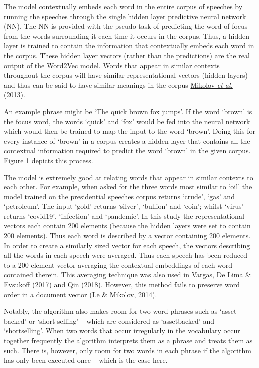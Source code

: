 \documentclass[11pt,preprint, authoryear]{elsarticle}
\numberwithin{equation}{section}
\numberwithin{figure}{section}
\numberwithin{table}{section}
\begin{document}
The model contextually embeds each word in the entire corpus of speeches
by running the speeches through the single hidden layer predictive
neural network (NN). The NN is provided with the pseudo-task of
predicting the word of focus from the words surrounding it each time it
occurs in the corpus. Thus, a hidden layer is trained to contain the
information that contextually embeds each word in the corpus. These
hidden layer vectors (rather than the predictions) are the real output
of the Word2Vec model. Words that appear in similar contexts throughout
the corpus will have similar representational vectors (hidden layers)
and thus can be said to have similar meanings in the corpus
\protect\hyperlink{ref-mikolov2013distributed}{Mikolov \emph{et al.}}
(\protect\hyperlink{ref-mikolov2013distributed}{2013}).

An example phrase might be `The quick brown fox jumps'. If the word
`brown' is the focus word, the words `quick' and `fox' would be fed into
the neural network which would then be trained to map the input to the
word `brown'. Doing this for every instance of `brown' in a corpus
creates a hidden layer that contains all the contextual information
required to predict the word `brown' in the given corpus. Figure 1
depicts this process.

The model is extremely good at relating words that appear in similar
contexts to each other. For example, when asked for the three words most
similar to `oil' the model trained on the presidential speeches corpus
returns `crude', `gas' and `petroleum'. The input `gold' returns
`silver', `bullion' and `coin'; whilst `virus' returns `covid19',
`infection' and `pandemic'. In this study the representational vectors
each contain 200 elements (because the hidden layers were set to contain
200 elements). Thus each word is described by a vector containing 200
elements. In order to create a similarly sized vector for each speech,
the vectors describing all the words in each speech were averaged. Thus
each speech has been reduced to a 200 element vector averaging the
contextual embeddings of each word contained therein. This averaging
technique was also used in
\protect\hyperlink{ref-vargas2017deep}{Vargas, De Lima \& Evsukoff}
(\protect\hyperlink{ref-vargas2017deep}{2017}) and
\protect\hyperlink{ref-qin230natural}{Qin}
(\protect\hyperlink{ref-qin230natural}{2018}). However, this method
fails to preserve word order in a document vector
(\protect\hyperlink{ref-le2014distributed}{Le \& Mikolov, 2014}).

Notably, the algorithm also makes room for two-word phrases such as
`asset backed' or `short selling' -- which are considered as
`assetbacked' and `shortselling'. When two words that occur irregularly
in the vocabulary occur together frequently the algorithm interprets
them as a phrase and treats them as such. There is, however, only room
for two words in each phrase if the algorithm has only been executed
once -- which is the case here.
\end{document}
